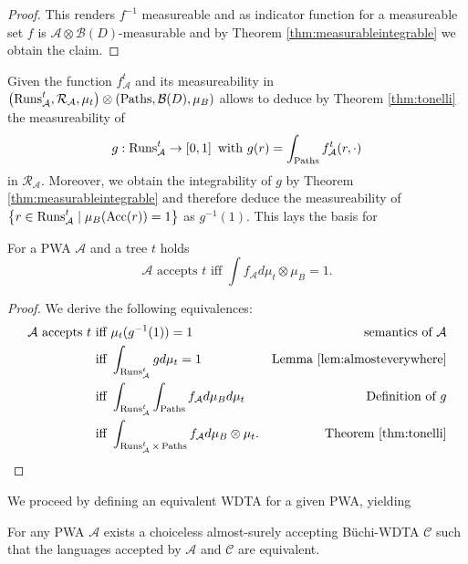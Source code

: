 \begin{proof}
  This renders $f^{-1}$ measureable and as indicator function for a measureable
  set $f$ is $\mathcal{A}\otimes\mathcal{B}(D)$-measurable and by Theorem 
  \ref{thm:measurableintegrable} we obtain the claim.
\end{proof}

Given the function $f_{\mathcal{A}}^{t}$ and its measureability in
$\left(\operatorname{Runs}_{\mathcal{A}}^{t}, \mathcal{R}_{\mathcal{A}},\mu_{t}\right)\otimes
  \left(\operatorname{Paths}, \mathcal{B}(D), \mu_{B}\right)$ allows to deduce by Theorem
\ref{thm:tonelli} the measureability of
\begin{equation*}
  g:\operatorname{Runs}_{\mathcal{A}}^{t}\rightarrow\left[0,1\right]\text{ with } 
    g(r) = \int_{\operatorname{Paths}}f_{\mathcal{A}}^{t}(r, \cdot)
\end{equation*}
in $\mathcal{R}_{\mathcal{A}}$. Moreover, we obtain the integrability of $g$ by 
Theorem \ref{thm:measurableintegrable} and therefore deduce the measureability
of $\left\{r\in\operatorname{Runs}_{\mathcal{A}}^{t}\mid\mu_{B}(\operatorname{Acc}(r)) = 1 \right\}$ as $g^{-1}(1)$.
This lays the basis for 
\begin{proposition}
  \cite[Proposition 42]{RandAutoInfTrees}
  For a \ac{PWA} $\mathcal{A}$ and a tree $t$ holds
  \begin{equation*}
    \mathcal{A}\text{ accepts }t
    \text{ iff }
    \int f_{\mathcal{A}} d\mu_{t}\otimes\mu_{B} = 1.
  \end{equation*}
  \label{prop:pwabyf}
\end{proposition}
\begin{proof}
  We derive the following equivalences:
  \begin{align*}
    \mathcal{A}\text{ accepts }t
     &\text{ iff }\mu_{t}(g^{-1}(1)) = 1&\text{semantics of }\mathcal{A}\\
    &\text{ iff }\int_{\operatorname{Runs}_{\mathcal{A}}^{t}} g d\mu_{t} = 1
     &\text{Lemma \ref{lem:almosteverywhere}}\\
    &\text{ iff }\int_{\operatorname{Runs}_{\mathcal{A}}^{t}}\int_{\operatorname{Paths}} f_{\mathcal{A}} 
      d\mu_{B} d\mu_{t} &\text{Definition of }g\\
    &\text{ iff }\int_{\operatorname{Runs}_{\mathcal{A}}^{t}\times\operatorname{Paths}}  f_{\mathcal{A}}
      d\mu_{B}\otimes\mu_{t}. &\text{Theorem \ref{thm:tonelli}}
  \end{align*}
\end{proof}
We proceed by defining an equivalent \ac{WDTA} for a given \ac{PWA}, yielding
\begin{theorem}
  For any \ac{PWA} $\mathcal{A}$ exists a choiceless almost-surely accepting
  Büchi-\ac{WDTA} $\mathcal{C}$ such that the languages accepted by
  $\mathcal{A}$ and $\mathcal{C}$ are equivalent.
  \label{thm:PWAasWDTA}
\end{theorem}
